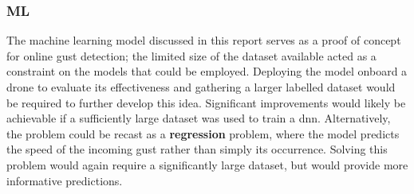 \subsubsection{ML}

The machine learning model discussed in this report serves as a proof of concept for online gust detection; the limited size of the dataset available acted as a constraint on the models that could be employed. Deploying the model onboard a drone to evaluate its effectiveness and gathering a larger labelled dataset would be required to further develop this idea. Significant improvements would likely be achievable if a sufficiently large dataset was used to train a \gls{dnn}. Alternatively, the problem could be recast as a \textbf{regression} problem, where the model predicts the speed of the incoming gust rather than simply its occurrence. Solving this problem would again require a significantly large dataset, but would provide more informative predictions. 

\newpage

